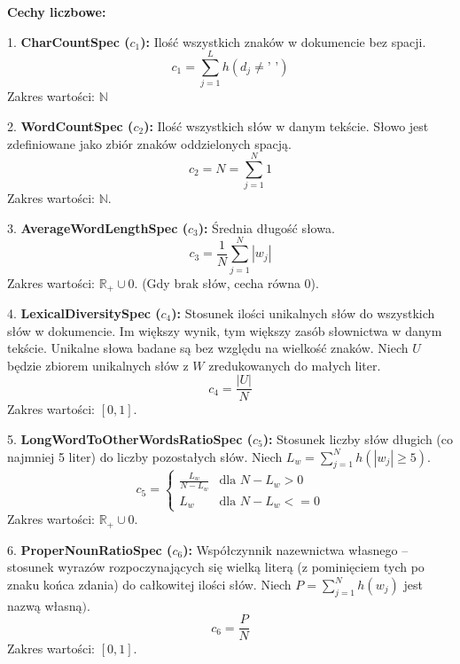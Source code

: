 \documentclass{article}
\begin{document}
	\noindent
	\textbf{Cechy liczbowe:}
	
	1. \textbf{CharCountSpec (\(c_1\)):} Ilość wszystkich znaków w dokumencie bez spacji.
	\begin{equation}
		c_1 = \sum_{j=1}^{L} h(d_j \neq \text{' '})
	\end{equation}
	Zakres wartości: \(\mathbb{N}\)
	
	2. \textbf{WordCountSpec (\(c_2\)):} Ilość wszystkich słów w danym tekście. Słowo jest zdefiniowane jako zbiór znaków oddzielonych spacją.
	\begin{equation}
		c_2 = N = \sum_{j=1}^{N} 1
	\end{equation}
	Zakres wartości: \(\mathbb{N}\).
	
	3. \textbf{AverageWordLengthSpec (\(c_3\)):} Średnia długość słowa.
	\begin{equation}
		c_3 = \frac{1}{N} \sum_{j=1}^{N} |w_j|
	\end{equation}
	Zakres wartości: \(\mathbb{R}_{+} \cup 0\). (Gdy brak słów, cecha równa 0).
	
	4. \textbf{LexicalDiversitySpec (\(c_4\)):} Stosunek ilości unikalnych słów do wszystkich słów w dokumencie. Im większy wynik, tym większy zasób słownictwa w danym tekście. Unikalne słowa badane są bez względu na wielkość znaków. Niech \(U\) będzie zbiorem unikalnych słów z \(W\) zredukowanych do małych liter.
	\begin{equation}
		c_4 = \frac{|U|}{N}
	\end{equation}
	Zakres wartości: \([0, 1]\).
	
	5. \textbf{LongWordToOtherWordsRatioSpec (\(c_5\)):} Stosunek liczby słów długich (co najmniej 5 liter) do liczby pozostałych słów. Niech \(L_w = \sum_{j=1}^{N} h(|w_j|\ge 5)\).
	\begin{equation}
		c_5 = \begin{cases}
			\frac{L_w}{N - L_w} & \text{dla } N - L_w > 0 \\
			L_w & \text{dla } N - L_w <= 0
		\end{cases}
	\end{equation}
	Zakres wartości: \(\mathbb{R}_{+} \cup 0\).
	
	6. \textbf{ProperNounRatioSpec (\(c_6\)):} Współczynnik nazewnictwa własnego – stosunek wyrazów rozpoczynających się wielką literą (z pominięciem tych po znaku końca zdania) do całkowitej ilości słów. 
	Niech \(P = \sum_{j=1}^{N} h(w_j)\) jest nazwą własną\()\).
	\begin{equation}
		c_6 = \frac{P}{N}
	\end{equation}
	Zakres wartości: \([0, 1]\).
	
\end{document}
